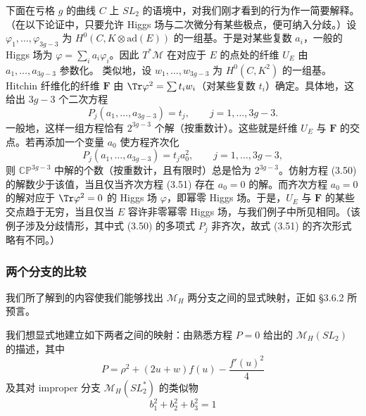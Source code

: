 下面在亏格 $g$ 的曲线 $C$ 上 $SL_2$ 的语境中，对我们刚才看到的行为作一简要解释。（在以下论证中，只要允许 Higgs 场与二次微分有某些极点，便可纳入分歧。）设 $\varphi_1,\dots,\varphi_{3g-3}$ 为 $H^0(C,K\otimes\mathrm{ad}(E))$ 的一组基。于是对某些复数 $a_i$，一般的 Higgs 场为 $\varphi=\sum_ia_i\varphi_i$。因此 $T^*\mathcal{M}$ 在对应于 $E$ 的点处的纤维 $U_E$ 由 $a_1,\dots,a_{3g-3}$ 参数化。
类似地，设 $w_1,\dots,w_{3g-3}$ 为 $H^0(C,K^2)$ 的一组基。Hitchin 纤维化的纤维 $\boldsymbol{F}$ 由 $\Tr\varphi^2=\sum t_iw_i$（对某些复数 $t_i$）确定。具体地，这给出 $3g-3$ 个二次方程
\begin{equation}\tag{3.50}
P_j(a_1,\dots,a_{3g-3})=t_j,\qquad j=1,\dots,3g-3.
\end{equation}
一般地，这样一组方程恰有 $2^{3g-3}$ 个解（按重数计）。这些就是纤维 $U_E$ 与 $\boldsymbol{F}$ 的交点。若再添加一个变量 $a_0$ 使方程齐次化
\begin{equation}\tag{3.51}
P_j(a_1,\dots,a_{3g-3})=t_ja_0^2,\qquad j=1,\dots,3g-3,
\end{equation}
则 $\mathbb{C}\mathbb{P}^{3g-3}$ 中解的个数（按重数计，且有限时）总是恰为 $2^{3g-3}$。仿射方程 (3.50) 的解数少于该值，当且仅当齐次方程 (3.51) 存在 $a_0=0$ 的解。而齐次方程 $a_0=0$ 的解对应于 $\Tr\varphi^2=0$ 的 Higgs 场 $\varphi$，即幂零 Higgs 场。于是，$U_E$ 与 $\boldsymbol{F}$ 的某些交点趋于无穷，当且仅当 $E$ 容许非零幂零 Higgs 场，与我们例子中所见相同。（该例子涉及分歧情形，其中式 (3.50) 的多项式 $P_j$ 非齐次，故式 (3.51) 的齐次形式略有不同。）

\subsubsection{两个分支的比较}

我们所了解到的内容使我们能够找出 $\mathcal{M}_H$ 两分支之间的显式映射，正如 §3.6.2 所预言。

我们想显式地建立如下两者之间的映射：由熟悉方程 $P=0$ 给出的 $\mathcal{M}_H(SL_2)$ 的描述，其中
\begin{equation}\tag{3.52}
P=\rho^2+(2u+w)f(u)-\frac{f'(u)^2}{4}
\end{equation}
及其对 improper 分支 $\mathcal{M}_H(SL_2^*)$ 的类似物
\begin{equation}\tag{3.53}
b_1^2+b_2^2+b_3^2=1
\end{equation}

